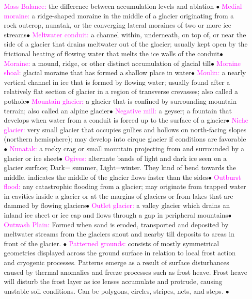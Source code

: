 \documentclass{article}
\newcommand{\ddd}{$\bullet$}
\newcommand{\pink}[1]{\textcolor{magenta}{#1}}
\newcommand{\vocab}[1]{{\pink{#1}}}
\begin{document}
\begin{multicols*}{4}
		\vocab{Mass Balance: } the difference between accumulation levels and ablation \ddd
		\vocab{        Medial moraine: } a ridge-shaped moraine in the middle of a glacier originating from a rock outcrop, nunatak, or the converging lateral moraines of two or more ice streams\ddd
		\vocab{        Meltwater conduit: } a channel within, underneath, on top of, or near the side of a glacier that drains meltwater out of the glacier; usually kept open by the frictional heating of flowing water that melts the ice walls of the conduit\ddd
		\vocab{        Moraine: } a mound, ridge, or other distinct accumulation of glacial till\ddd
		\vocab{        Moraine shoal: } glacial moraine that has formed a shallow place in water\ddd
		\vocab{        Moulin: } a nearly vertical channel in ice that is formed by flowing water; usually found after a relatively flat section of glacier in a region of transverse crevasses; also called a pothole\ddd
		\vocab{        Mountain glacier: } a glacier that is confined by surrounding mountain terrain; also called an alpine glacier\ddd
		\vocab{        Negative mill: } a geyser; a fountain that develops when water from a conduit is forced up to the surface of a glacier\ddd
		\vocab{        Niche glacier: } very small glacier that occupies gullies and hollows on north-facing slopes (northern hemisphere); may develop into cirque glacier if conditions are favorable\ddd
		\vocab{        Nunatak: } a rocky crag or small mountain projecting from and surrounded by a glacier or ice sheet\ddd
		\vocab{        Ogives: } alternate bands of light and dark ice seen on a glacier surface; Dark= summer, Light=winter. They kind of bend towards the middle. {indicates the middle of the glacier flows faster than the sides}\ddd
		\vocab{        Outburst flood: } any catastrophic flooding from a glacier; may originate from trapped water in cavities inside a glacier or at the margins of glaciers or from lakes that are dammed by flowing glaciers\ddd
		\vocab{        Outlet glacier: } a valley glacier which drains an inland ice sheet or ice cap and flows through a gap in peripheral mountains\ddd
		\vocab{Outwash Plain: } Formed when sand is eroded, transported and deposited by meltwater streams from the glaciers snout and nearby till deposits to areas in front of the glacier. \ddd
		\vocab{        Patterned grounds: } consists of mostly symmetrical geometries displayed across the ground surface in relation to local frost action and cryogenic processes. Patterns emerge as a result of surface disturbances caused by thermal anomalies and freeze processes such as frost heave. Frost heave will disturb the frost layer as ice lenses accumulate and protrude, causing unstable soil conditions. Can be polygons, circles, stripes, nets, and steps. \ddd

\end{multicols*}
\end{document}
